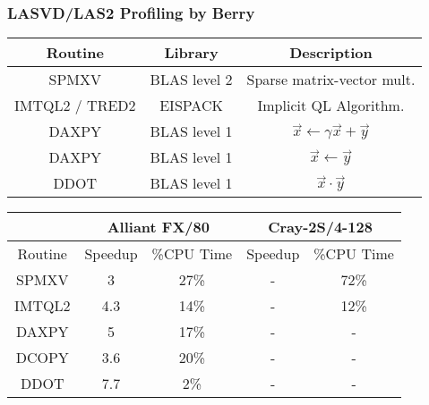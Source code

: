 \begin{frame}[plain]
	\frametitle{LASVD/LAS2 Profiling by Berry}
	\begin{block}{}
\begin{table}[!h]
\begin{center}
\begin{tabular}{|c|c|c|}
\hline
Routine & Library & Description \\
\hline
\hline
SPMXV & BLAS level 2 & Sparse matrix-vector mult. \\
\hline
IMTQL2 / TRED2 & EISPACK & Implicit QL Algorithm. \\
\hline
DAXPY & BLAS level 1 & $\vec{x} \gets \gamma \vec{x} + \vec{y}$ \\
\hline
DAXPY & BLAS level 1 & $\vec{x} \gets \vec{y}$ \\
\hline
DDOT & BLAS level 1 & $\vec{x} \cdot \vec{y}$ \\
\hline
\end{tabular}
\end{center}
\end{table}
\begin{table}[!h]
\begin{center}
\begin{tabular}{|c|c|c|c|c|}
\hline
& \multicolumn{2}{|c|}{Alliant FX/80} & \multicolumn{2}{|c|}{Cray-2S/4-128} \\
\hline
Routine & Speedup & \%CPU Time & Speedup & \%CPU Time \\
\hline
\hline
SPMXV & 3 & 27\% & - & 72\% \\
\hline
IMTQL2 & 4.3 & 14\% & - & 12\% \\
\hline
DAXPY & 5 & 17\% & - & - \\
\hline
DCOPY & 3.6 & 20\% & - & - \\
\hline
DDOT & 7.7 & 2\% & - & - \\
\hline
\hline
\end{tabular}
\end{center}
\end{table}
	\end{block}  
\end{frame}
